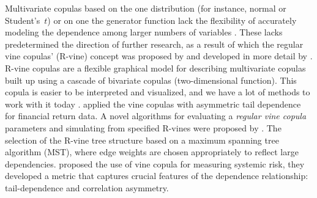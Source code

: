 Multivariate copulas based on the one distribution (for instance, normal or Student's~$t$) or on one the generator function lack the flexibility of accurately modeling the dependence among larger numbers of variables \cite{Brechmann2013}. 
These lacks predetermined the direction of further research, as a result of which the regular vine copulas' (R-vine) concept was proposed by \cite{Joe1996} and developed in more detail by \cite{Brechmann2013, Cooke2015}.
R-vine copulas are a flexible graphical model for describing multivariate copulas built up using
a cascade of bivariate copulas (two-dimensional function). 
This copula is easier to be interpreted and visualized, and we have a lot of methods to work with it today \cite{Nikoloulopoulos2012, Cooke2015, Czado2010, Dissmann2013}. 
\cite{Nikoloulopoulos2012} applied the vine copulas with asymmetric tail dependence for financial return data.
A novel algorithms for evaluating a \textit{regular vine copula} parameters and simulating
from specified R-vines were proposed by \cite{Dissmann2013}. 
The selection of the R-vine tree structure based on a maximum spanning tree algorithm (MST), where edge weights are chosen appropriately to reflect large dependencies.
\cite{Pourkhanali2016} proposed the use of vine copula for measuring systemic risk, they developed a metric that captures crucial features of the dependence relationship: tail-dependence and correlation asymmetry.